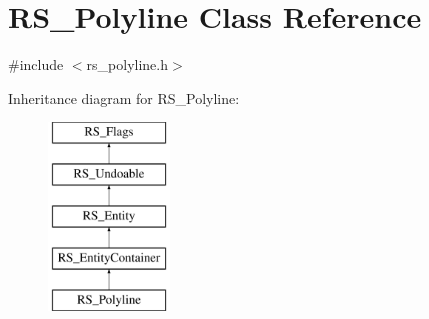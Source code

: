 \hypertarget{classRS__Polyline}{\section{R\-S\-\_\-\-Polyline Class Reference}
\label{classRS__Polyline}
}


{\ttfamily \#include $<$rs\-\_\-polyline.\-h$>$}

Inheritance diagram for R\-S\-\_\-\-Polyline\-:\begin{figure}[H]
\begin{center}
\leavevmode
\includegraphics[height=5.000000cm]{classRS__Polyline}
\end{center}
\end{figure}
